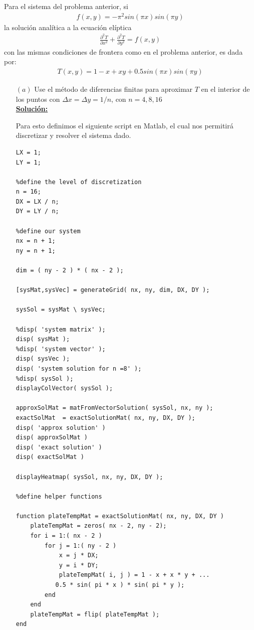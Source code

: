Para el sistema del problema anterior, si
\begin{gather*}
f(x,y) = -\pi^{2} sin( \pi x ) sin( \pi y )
\end{gather*}
la solución analítica a la ecuación elíptica
\begin{gather*}
\frac{\partial^{2} T}{\partial x^{2}} + \frac{\partial^{2} T}{\partial y^{2}} = f(x,y)
\end{gather*}
con las mismas condiciones de frontera como en el problema anterior, es dada por:
\begin{gather*}
T(x,y) = 1 - x + xy + 0.5 sin( \pi x ) sin( \pi y )
\end{gather*}

\begin{itemize}
\item[$(a)$] Use el método de diferencias finitas para aproximar $T$ en el interior de los puntos con $\Delta x = \Delta y = 1 / n$, con $n=4,8,16$\\
\textbf{\underline{Solución:}}

Para esto definimos el siguiente script en Matlab, el cual nos permitirá discretizar y resolver el sistema dado.

\lstset{language=Matlab}
\begin{lstlisting}[frame=single]
%define the domain of the problem
LX = 1;
LY = 1;

%define the level of discretization
n = 16;
DX = LX / n;
DY = LY / n;

%define our system
nx = n + 1;
ny = n + 1;

dim = ( ny - 2 ) * ( nx - 2 );

[sysMat,sysVec] = generateGrid( nx, ny, dim, DX, DY );

sysSol = sysMat \ sysVec;

%disp( 'system matrix' );
disp( sysMat );
%disp( 'system vector' );
disp( sysVec );
disp( 'system solution for n =8' );
%disp( sysSol );
displayColVector( sysSol );

approxSolMat = matFromVectorSolution( sysSol, nx, ny );
exactSolMat  = exactSolutionMat( nx, ny, DX, DY );
disp( 'approx solution' )
disp( approxSolMat )
disp( 'exact solution' )
disp( exactSolMat )

displayHeatmap( sysSol, nx, ny, DX, DY );

%define helper functions

function plateTempMat = exactSolutionMat( nx, ny, DX, DY )
    plateTempMat = zeros( nx - 2, ny - 2);
    for i = 1:( nx - 2 )
        for j = 1:( ny - 2 )
            x = j * DX;
            y = i * DY;
            plateTempMat( i, j ) = 1 - x + x * y + ...
		   0.5 * sin( pi * x ) * sin( pi * y );
        end
    end
    plateTempMat = flip( plateTempMat );
end


\end{lstlisting}
\end{itemize}
